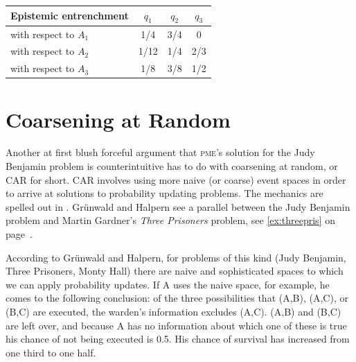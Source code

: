 \documentclass[phd,12pt,oneside]{ubcthesis}
\begin{document}
\begin{tabular}{|l|c|c|c|}\hline
Epistemic entrenchment & $q_{1}$ & $q_{2}$ & $q_{3}$ \\ \hline
with respect to $A_{1}$ & 1/4 & 3/4 & 0 \\ \hline
with respect to $A_{2}$ & 1/12 & 1/4 & 2/3 \\ \hline
with respect to $A_{3}$ & 1/8 & 3/8 & 1/2 \\ \hline
\end{tabular}

\section{Coarsening at Random}
\label{sec:ahdiesho}

Another at first blush forceful argument that \textsc{pme}'s solution
for the Judy Benjamin problem is counterintuitive has to do with
coarsening at random, or CAR for short. CAR involves using more naive
(or coarse) event spaces in order to arrive at solutions to
probability updating problems. The mechanics are spelled out in
. Gr{\"u}nwald and Halpern see a
parallel between the Judy Benjamin problem and Martin Gardner's
\emph{Three Prisoners} problem, see {\xample} \ref{ex:threepris} on
page~\pageref{page:iabeiwet}.


According to Gr{\"u}nwald and Halpern, for problems of this kind (Judy
Benjamin, Three Prisoners, Monty Hall) there are naive and
sophisticated spaces to which we can apply probability updates. If A
uses the naive space, for example, he comes to the following
conclusion: of the three possibilities that (A,B), (A,C), or (B,C) are
executed, the warden's information excludes (A,C). (A,B) and (B,C) are
left over, and because A has no information about which one of these
is true his chance of not being executed is 0.5. His chance of
survival has increased from one third to one half. 
\end{document}
